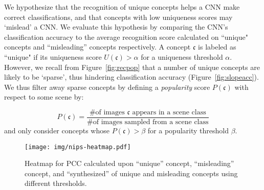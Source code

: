 \documentclass{article}
\begin{document}
We hypothesize that the recognition of unique concepts helps a CNN make correct classifications, 
and that concepts with low uniqueness scores may `mislead' a CNN. We evaluate this hypothesis
by comparing the CNN's classification accuracy to the average recognition score calculated on ``unique" concepts and ``misleading'' concepts respectively. A concept $\mathfrak{c}$ is labeled as ``unique" if its uniqueness score $U(\mathfrak{c}) > \alpha$ for a uniqueness threshold $\alpha$. 
However, we recall from Figure~\ref{fig:recpop} that a number
of unique concepts are likely to be `sparse', thus hindering classification accuracy (Figure~\ref{fig:slopeacc}). We thus filter away sparse concepts by defining a {\em popularity} score
$P(\mathfrak{c})$ with respect to some scene by: 

$$P(\mathfrak{c}) = \frac{\text{\# of images $\mathfrak{c}$ appears in a scene class}}{\text{\# of images sampled from a scene class}}$$
and only consider concepts whose $P(\mathfrak{c}) > \beta$ for a popularity threshold $\beta$. 

\begin{figure}[h]
  \centering
  \texttt{[image: img/nips-heatmap.pdf]}
  \caption{Heatmap for PCC calculated upon ``unique'' concept, ``misleading'' concept, and ``synthesized'' of unique and misleading concepts using different thresholds.}
  \label{fig:nips-heatmap}
\end{figure}
\end{document}
